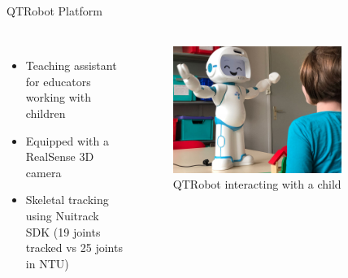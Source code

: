 \documentclass[aspectratio=169, xcolor=dvipsnames]{beamer}
\begin{document}
\begin{frame}{QTRobot Platform}
      \framesubtitle{}%
      
      \begin{columns}
      \begin{itemize}
            \item Teaching assistant for educators working with children
            \item Equipped with a RealSense 3D camera
            \item Skeletal tracking using Nuitrack SDK (19 joints tracked vs 25 joints in NTU)
      \end{itemize}

      \begin{figure}[ht!]
            \centering
            \includegraphics[width=0.8\textwidth]{images/qtrobot_with_child.jpeg}
            \caption{QTRobot interacting with a child\footnotemark}
      \end{figure}
      \end{columns}
\end{frame}
\end{document}
